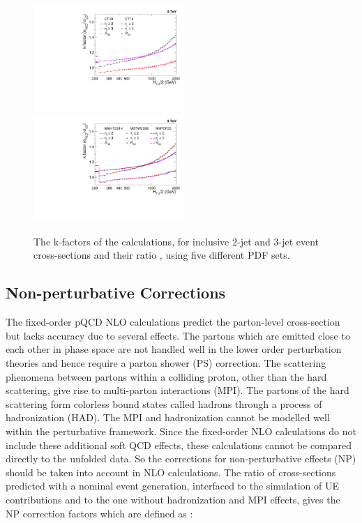 \begin{figure}[!htbp]
 \begin{center}
 \hspace*{-5mm}\includegraphics[width=0.51\textwidth]{Plots_HT_2_150/Kfactor_all_1.pdf}%
 ~~\includegraphics[width=0.51\textwidth]{Plots_HT_2_150/Kfactor_all_2.pdf}
 \caption[The k-factors using five different PDF sets.]{The k-factors of the \NLOJETPP calculations, for inclusive 2-jet and 3-jet event cross-sections and their ratio \ratio, using five different PDF sets.}
 \label{fig:kfactor}
 \end{center}
\end{figure}

\subsection{Non-perturbative Corrections}
\label{sec:NPcorr}

The fixed-order pQCD NLO calculations predict the parton-level cross-section but lacks accuracy due to several effects. The partons which are emitted close to each other in phase space are not handled well in the lower order perturbation theories and hence require a parton shower (PS) correction. The scattering phenomena between partons within a colliding proton, other than the hard scattering, give rise to multi-parton interactions (MPI). The partons of the hard scattering form colorless bound states called hadrons through a process of hadronization (HAD). The MPI and hadronization cannot be modelled well within the perturbative framework. Since the fixed-order NLO calculations do not include these additional soft QCD effects, these calculations cannot be compared directly to the unfolded data. So the corrections for non-perturbative effects (NP) should be taken into account in NLO calculations. The ratio of cross-sections predicted with a nominal event generation, interfaced to the simulation of UE contributions and to the one without hadronization and MPI effects, gives the NP correction factors which are defined as : 

